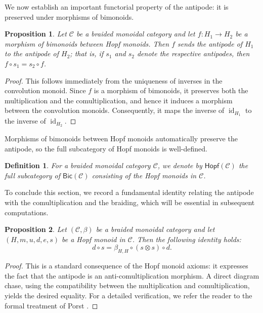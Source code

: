 \documentclass{amsart}
\newtheorem{proposition}{Proposition}[section]
\newtheorem{definition}{Definition}[section]
\begin{document}
We now establish an important functorial property of the antipode: it is preserved under morphisms of bimonoids.

\begin{proposition}\label{prop:antipode_functorial}
Let $\mathcal{C}$ be a braided monoidal category and let $f \colon H_1 \longrightarrow H_2$ be a morphism of bimonoids between Hopf monoids. Then $f$ sends the antipode of $H_1$ to the antipode of $H_2$; that is, if $s_1$ and $s_2$ denote the respective antipodes, then $f \circ s_1 = s_2 \circ f$.
\end{proposition}

\begin{proof}
This follows immediately from the uniqueness of inverses in the convolution monoid. Since $f$ is a morphism of bimonoids, it preserves both the multiplication and the comultiplication, and hence it induces a morphism between the convolution monoids. Consequently, it maps the inverse of $\operatorname{id}_{H_1}$ to the inverse of $\operatorname{id}_{H_2}$.
\end{proof}

Morphisms of bimonoids between Hopf monoids automatically preserve the antipode, so the full subcategory of Hopf monoids is well-defined.

\begin{definition}\label{def:hopf_category}
For a braided monoidal category $\mathcal{C}$, we denote by $\mathsf{Hopf}(\mathcal{C})$ the full subcategory of $\mathsf{Bic}(\mathcal{C})$ consisting of the Hopf monoids in $\mathcal{C}$.
\end{definition}

To conclude this section, we record a fundamental identity relating the antipode with the comultiplication and the braiding, which will be essential in subsequent computations.

\begin{proposition}\label{prop:antipode_braiding}
Let $(\mathcal{C}, \beta)$ be a braided monoidal category and let $(H, m, u, d, e, s)$ be a Hopf monoid in $\mathcal{C}$. Then the following identity holds:
\[
d \circ s = \beta_{H,H} \circ (s \otimes s) \circ d.
\]
\end{proposition}

\begin{proof}
This is a standard consequence of the Hopf monoid axioms: it expresses the fact that the antipode is an anti-comultiplication morphism. A direct diagram chase, using the compatibility between the multiplication and comultiplication, yields the desired equality. For a detailed verification, we refer the reader to the formal treatment of Porst \cite{FT}.
\end{proof}
\end{document}
